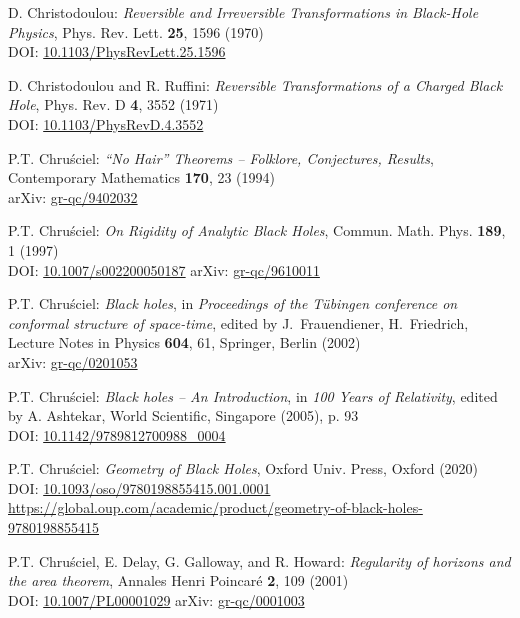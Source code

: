 \begin{thebibliography}{123}
D. Christodoulou:
{\em Reversible and Irreversible Transformations in Black-Hole Physics},
Phys. Rev. Lett. {\bf 25}, 1596 (1970)\\
DOI: \href{https://doi.org/10.1103/PhysRevLett.25.1596}{10.1103/PhysRevLett.25.1596}

D. Christodoulou and R. Ruffini:
{\em Reversible Transformations of a Charged Black Hole},
Phys. Rev. D {\bf 4}, 3552 (1971)\\
DOI: \href{https://doi.org/10.1103/PhysRevD.4.3552}{10.1103/PhysRevD.4.3552}

P.T. Chru\'sciel:
{\em ``No Hair'' Theorems -- Folklore, Conjectures, Results},
Contemporary Mathematics {\bf 170}, 23 (1994)\\
arXiv: \href{https://arxiv.org/abs/gr-qc/9402032}{gr-qc/9402032}

P.T. Chru\'sciel: {\em On Rigidity of Analytic Black Holes},
Commun. Math. Phys. {\bf 189}, 1 (1997) \\
DOI: \href{https://doi.org/10.1007/s002200050187}{10.1007/s002200050187}\hfill
arXiv: \href{https://arxiv.org/abs/gr-qc/9610011}{gr-qc/9610011}

P.T. Chru\'sciel: {\em Black holes},
in {\em Proceedings of the T\"ubingen conference on conformal structure of
space-time}, edited by J.~Frauendiener, H.~Friedrich,
Lecture Notes in Physics {\bf 604}, 61,
Springer, Berlin (2002)\\
arXiv: \href{https://arxiv.org/abs/gr-qc/0201053}{gr-qc/0201053}

P.T. Chru\'sciel: {\em Black holes -- An Introduction},
in {\em 100 Years of Relativity}, edited by A. Ashtekar,
World Scientific, Singapore (2005), p. 93\\
DOI: \href{https://doi.org/10.1142/9789812700988_0004}{10.1142/9789812700988\_0004}

P.T. Chru\'sciel: {\em Geometry of Black Holes},
Oxford Univ. Press, Oxford (2020)\\
DOI: \href{https://doi.org/10.1093/oso/9780198855415.001.0001}{10.1093/oso/9780198855415.001.0001}\\
{\footnotesize \url{https://global.oup.com/academic/product/geometry-of-black-holes-9780198855415}}

P.T. Chru\'sciel, E. Delay, G. Galloway, and R. Howard:
{\em Regularity of horizons and the area theorem},
Annales Henri Poincar\'e {\bf 2}, 109 (2001)\\
DOI: \href{https://doi.org/10.1007/PL00001029}{10.1007/PL00001029}\hfill
arXiv: \href{https://arxiv.org/abs/gr-qc/0001003}{gr-qc/0001003}


\end{thebibliography}
